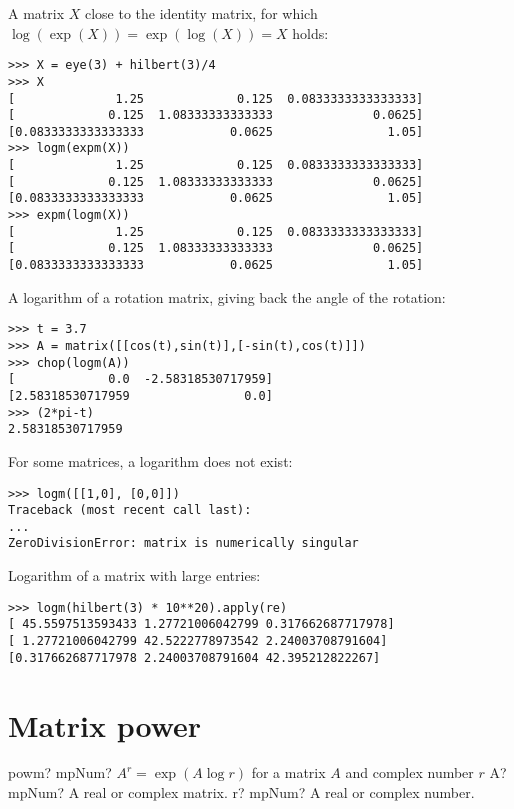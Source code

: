 A matrix $X$ close to the identity matrix, for which $\log(\exp(X))=\exp(\log(X))=X$ holds:

\begin{lstlisting}
>>> X = eye(3) + hilbert(3)/4
>>> X
[              1.25             0.125  0.0833333333333333]
[             0.125  1.08333333333333              0.0625]
[0.0833333333333333            0.0625                1.05]
>>> logm(expm(X))
[              1.25             0.125  0.0833333333333333]
[             0.125  1.08333333333333              0.0625]
[0.0833333333333333            0.0625                1.05]
>>> expm(logm(X))
[              1.25             0.125  0.0833333333333333]
[             0.125  1.08333333333333              0.0625]
[0.0833333333333333            0.0625                1.05]
\end{lstlisting}

A logarithm of a rotation matrix, giving back the angle of the rotation:

\begin{lstlisting}
>>> t = 3.7
>>> A = matrix([[cos(t),sin(t)],[-sin(t),cos(t)]])
>>> chop(logm(A))
[             0.0  -2.58318530717959]
[2.58318530717959                0.0]
>>> (2*pi-t)
2.58318530717959
\end{lstlisting}

For some matrices, a logarithm does not exist:

\begin{lstlisting}
>>> logm([[1,0], [0,0]])
Traceback (most recent call last):
...
ZeroDivisionError: matrix is numerically singular
\end{lstlisting}

Logarithm of a matrix with large entries:

\begin{lstlisting}
>>> logm(hilbert(3) * 10**20).apply(re)
[ 45.5597513593433 1.27721006042799 0.317662687717978]
[ 1.27721006042799 42.5222778973542 2.24003708791604]
[0.317662687717978 2.24003708791604 42.395212822267]
\end{lstlisting}


\newpage
\section{Matrix power}


\begin{mpFunctionsExtract}
	\mpFunctionTwo
	{powm? mpNum? $A^r=\exp(A \log r)$ for a matrix $A$ and complex number $r$}
	{A? mpNum? A real or complex matrix.}	
	{r? mpNum? A real or complex number.}	
\end{mpFunctionsExtract}


